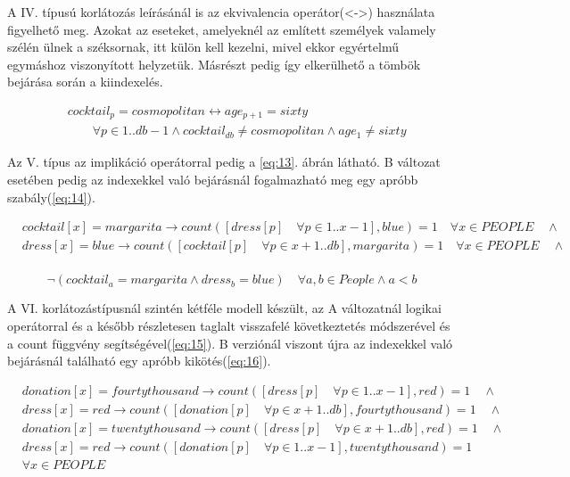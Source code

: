 \documentclass[12pt,a4paper,twoside, openright]{report}
\begin{document}
    A IV. típusú korlátozás leírásánál is az ekvivalencia operátor(<->) használata figyelhető meg.
    Azokat az eseteket, amelyeknél az említett személyek valamely szélén ülnek a széksornak, itt külön kell kezelni, mivel ekkor egyértelmű egymáshoz viszonyított helyzetük.
    Másrészt pedig így elkerülhető a tömbök bejárása során a 
    kiindexelés.

	\begin{equation} \label{eq:12}
	\begin{aligned}
	&cocktail_p=cosmopolitan \leftrightarrow age_{p+1}=sixty \\
	&\quad\quad\forall p \in 1..db-1 \wedge cocktail_{db} \neq cosmopolitan \wedge age_1 \neq sixty
	\end{aligned} 
	\end{equation}

    Az V. típus az implikáció operátorral pedig a \ref{eq:13}. ábrán látható.
    B változat esetében pedig az indexekkel való bejárásnál fogalmazható meg egy apróbb szabály(\ref{eq:14}).
	
	\begin{equation} \label{eq:13}
		\begin{aligned}
		&cocktail[x]=margarita \rightarrow count([dress[p] \quad \forall p \in 1..x-1], blue)=1 \quad \forall x \in PEOPLE \quad \wedge \\
		&dress[x]=blue \rightarrow count([cocktail[p] \quad \forall p \in x+1..db], margarita)=1 \quad \forall x \in PEOPLE \quad \wedge \\
		\end{aligned}
	\end{equation}
	
   \begin{equation} \label{eq:14}
    \neg(cocktail_a =margarita \wedge dress_b=blue) \quad \forall a,b \in People \wedge a<b
     \end{equation}

    A VI. korlátozástípusnál szintén kétféle modell készült, az A változatnál logikai 
    operátorral és a később részletesen taglalt visszafelé következtetés módszerével és a count függvény segítségével(\ref{eq:15}).
    B verziónál viszont újra az indexekkel való bejárásnál található egy apróbb kikötés(\ref{eq:16}).

    \begin{equation} \label{eq:15}
    \begin{aligned}  
   	    &donation[x]=fourtythousand \rightarrow count([dress[p] \quad \forall p \in 1..x-1], red)=1 \quad \wedge \\
   	    &dress[x]=red \rightarrow count([donation[p] \quad \forall p \in x+1..db], fourtythousand)=1 \quad \wedge \\
   	    &donation[x]=twentythousand \rightarrow count([dress[p] \quad \forall p \in x+1..db], red)=1 \quad \wedge \\
   	    &dress[x]=red \rightarrow count([donation[p] \quad \forall p \in 1..x-1], twentythousand)=1 \\
        &\forall x \in PEOPLE
    \end{aligned}
    \end{equation}
    
\end{document}

